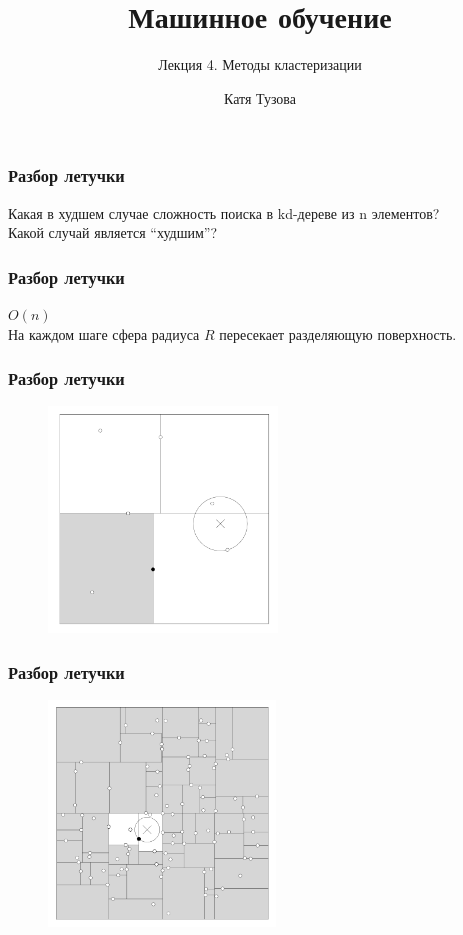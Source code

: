 \documentclass[12pt]{beamer}
\author{Катя Тузова}
\title{Машинное обучение}
\subtitle{Лекция 4. Методы кластеризации}
\date{}
\begin{document}
\frame{\titlepage}


\begin{frame}\frametitle{Разбор летучки}
Какая в худшем случае сложность поиска в kd-дереве из n элементов? \\
Какой случай является “худшим”?
\end{frame}

\begin{frame}\frametitle{Разбор летучки}
$O(n)$\\
На каждом шаге сфера радиуса $R$ пересекает разделяющую поверхность. 
\end{frame}


\begin{frame}\frametitle{Разбор летучки}
\begin{figure}[htbp]
\centering
\includegraphics[height=170pt]{images/kd-nn}  
\end{figure}
\end{frame}

\begin{frame}\frametitle{Разбор летучки}
\begin{figure}[htbp]
\centering
\includegraphics[height=170pt]{images/kd-nn1}  
\end{figure}
\end{frame}
\end{document}
